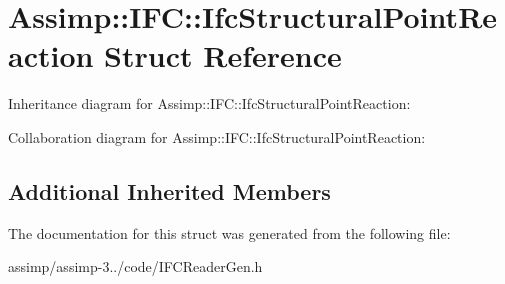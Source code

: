 \hypertarget{struct_assimp_1_1_i_f_c_1_1_ifc_structural_point_reaction}{\section{Assimp\+:\+:I\+F\+C\+:\+:Ifc\+Structural\+Point\+Reaction Struct Reference}
\label{struct_assimp_1_1_i_f_c_1_1_ifc_structural_point_reaction}
}


Inheritance diagram for Assimp\+:\+:I\+F\+C\+:\+:Ifc\+Structural\+Point\+Reaction\+:


Collaboration diagram for Assimp\+:\+:I\+F\+C\+:\+:Ifc\+Structural\+Point\+Reaction\+:
\subsection*{Additional Inherited Members}


The documentation for this struct was generated from the following file\+:\begin{DoxyCompactItemize}
\item 
assimp/assimp-\/3../code/I\+F\+C\+Reader\+Gen.\+h\end{DoxyCompactItemize}

